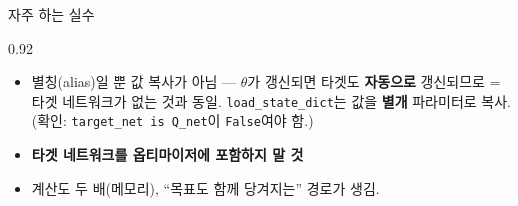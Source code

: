 \begin{frame}{자주 하는 실수}
\begin{center}\begin{varwidth}{0.92\textwidth}
  \small
  \begin{itemize}
    \item {} 별칭(alias)일 뿐
      값 복사가 아님 --- $\theta$가 갱신되면 타겟도 \textbf{자동으로}
      갱신되므로 = 타겟 네트워크가 없는 것과 동일.
      \texttt{load\_state\_dict}는 값을 \textbf{별개} 파라미터로 복사.
      (확인: \texttt{target\_net is Q\_net}이 \texttt{False}여야 함.)
    \item \textbf{타겟 네트워크를 옵티마이저에 포함하지 말 것}
    \item {} 계산도 두 배(메모리),
      ``목표도 함께 당겨지는'' 경로가 생김.
  \end{itemize}
  \normalsize
\end{varwidth}\end{center}
\end{frame}
